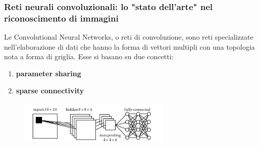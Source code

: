 \documentclass{beamer}
\begin{document}
\begin{frame}
	\frametitle{Reti neurali convoluzionali: lo "stato dell'arte" nel riconoscimento di immagini}
	Le  Convolutional  Neural  Networks,  o  reti  di  convoluzione,  sono  reti  
	specializzate nell’elaborazione di dati che hanno la forma di vettori multipli 
	con una topologia nota a forma di griglia. 
	Esse si basano su due concetti:
	\begin{enumerate}
		\item \textbf{parameter sharing}
		\item \textbf{sparse connectivity}
	\end{enumerate}
	
	\medskip
	\begin{figure}
		\includegraphics[width=0.65\textwidth]{cnn.PNG}
		
	\end{figure}
	
	
\end{frame}
\end{document}
